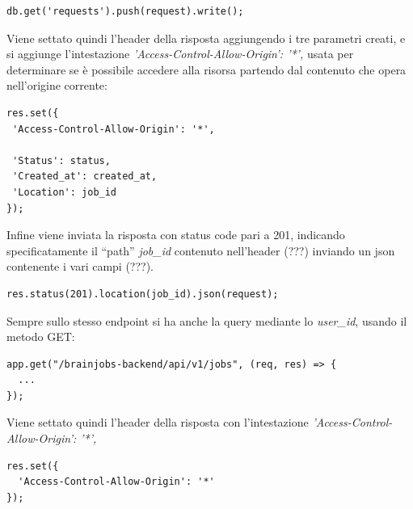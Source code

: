 \documentclass[a4paper,12pt, oneside]{book}
\begin{document}
\begin{shaded} 
\begin{verbatim}
db.get('requests').push(request).write();
\end{verbatim}
\end{shaded}
Viene settato quindi l'header della risposta aggiungendo i tre parametri creati,
e si aggiunge l'intestazione \textit{'Access-Control-Allow-Origin': '*',} usata per determinare
se è possibile accedere alla risorsa partendo dal contenuto che opera nell'origine corrente:
\begin{shaded} 
\begin{verbatim}
res.set({
 'Access-Control-Allow-Origin': '*',
    
 'Status': status,
 'Created_at': created_at,
 'Location': job_id
});              
\end{verbatim}
\end{shaded}
Infine viene inviata la risposta con status code pari a 201, indicando specificatamente il ``path'' \textit{job\_id} contenuto nell'header (???) inviando un json contenente i vari campi (???).\\
\begin{shaded} 
\begin{verbatim}
res.status(201).location(job_id).json(request);              
\end{verbatim}
\end{shaded}
Sempre sullo stesso endpoint si ha anche la query mediante lo \textit{user\_id}, usando il metodo GET:
\begin{shaded} 
\begin{verbatim}
app.get("/brainjobs-backend/api/v1/jobs", (req, res) => {
  ...
});
\end{verbatim}
\end{shaded}
Viene settato quindi l'header della risposta con l'intestazione \textit{'Access-Control-Allow-Origin': '*',}
\begin{shaded} 
\begin{verbatim}
res.set({
  'Access-Control-Allow-Origin': '*'                
});
\end{verbatim}
\end{shaded}
\end{document}

